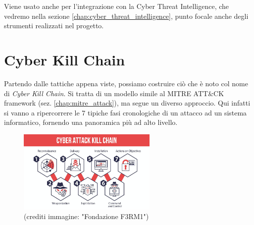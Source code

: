Viene usato anche per l'integrazione con la Cyber Threat Intelligence, che vedremo nella sezione \ref{chap:cyber_threat_intelligence}, punto focale anche degli strumenti realizzati nel progetto.

\section{Cyber Kill Chain}
Partendo dalle tattiche appena viste, possiamo costruire ciò che è noto col nome di \emph{Cyber Kill Chain}.
Si tratta di un modello simile al MITRE ATT\&CK framework (sez. \ref{chap:mitre_attack}), ma segue un diverso approccio. Qui infatti si vanno a ripercorrere le 7 tipiche fasi cronologiche di un attacco ad un sistema informatico, fornendo una panoramica più ad alto livello.

\begin{figure}[h]
    \centering
    \includegraphics[width=0.6\textwidth]{assets/cyber_kill_chain.png}
    \caption{(crediti immagine: "Fondazione F3RM1")}
    \label{fig:cyber_kill_chain}
\end{figure}

